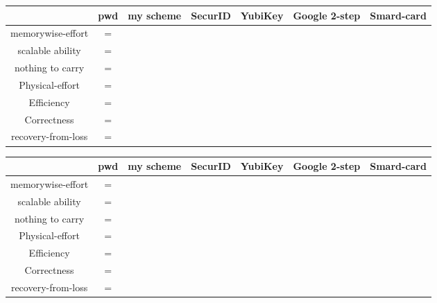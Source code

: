 \begin{CJK}{Bg5}{bsmi}
\begin{table}[h]
\begin{tabular}{|c|c|c|c|c|c|c|}
\hline
                   & pwd & my scheme & SecurID & YubiKey & Google 2-step & Smard-card \\ \hline
memorywise-effort  & =   &           &         &         &               &            \\ \hline
scalable ability   & =   &           &         &         &               &            \\ \hline
nothing to carry   & =   &           &         &         &               &            \\ \hline
Physical-effort    & =   &           &         &         &               &            \\ \hline
Efficiency         & =   &           &         &         &               &            \\ \hline
Correctness        & =   &           &         &         &               &            \\ \hline
recovery-from-loss & =   &           &         &         &               &            \\ \hline
\end{tabular}
\end{table}

\begin{table}[h]
\begin{tabular}{|c|c|c|c|c|c|c|}
\hline
                   & pwd & my scheme & SecurID & YubiKey & Google 2-step & Smard-card \\ \hline
memorywise-effort  & =   &           &         &         &               &            \\ \hline
scalable ability   & =   &           &         &         &               &            \\ \hline
nothing to carry   & =   &           &         &         &               &            \\ \hline
Physical-effort    & =   &           &         &         &               &            \\ \hline
Efficiency         & =   &           &         &         &               &            \\ \hline
Correctness        & =   &           &         &         &               &            \\ \hline
recovery-from-loss & =   &           &         &         &               &            \\ \hline
\end{tabular}
\end{table}

\end{CJK}